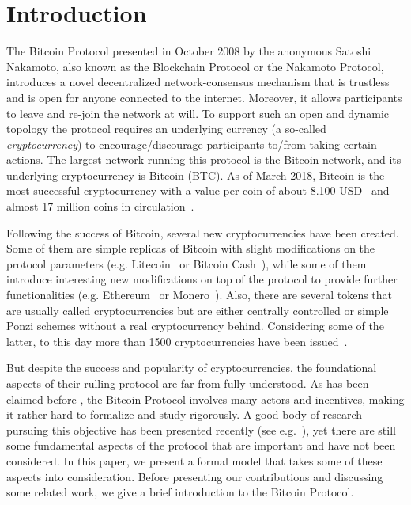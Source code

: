 
\section{Introduction}

The Bitcoin Protocol \cite{Bitcoin} presented in October 2008 by the anonymous Satoshi Nakamoto, also known as the Blockchain Protocol or the Nakamoto Protocol, introduces a novel decentralized network-consensus mechanism that is trustless and is open for anyone connected to the internet. Moreover, it allows participants to leave and re-join the network at will. To support such an open and dynamic topology the protocol requires an underlying currency (a so-called \emph{cryptocurrency}) to encourage/discourage participants to/from taking certain actions. The largest network running this protocol is the Bitcoin network, and its underlying cryptocurrency is Bitcoin (BTC). As of March 2018, Bitcoin is the most successful cryptocurrency with a value per coin of about 8.100 USD~\cite{BitcoinPrice} and almost 17 million coins in circulation~\cite{Totalcoins}.
 
Following the success of Bitcoin, several new cryptocurrencies have been created. Some of them are simple replicas of Bitcoin with slight modifications on the protocol parameters (e.g. Litecoin~\cite{Litecoin} or Bitcoin Cash~\cite{Bcash}), while some of them introduce interesting new modifications on top of the protocol to provide further functionalities (e.g. Ethereum~\cite{Ethereum} or Monero~\cite{Monero}). Also, there are several tokens that are usually called cryptocurrencies but are either centrally controlled or simple Ponzi schemes without a real cryptocurrency behind. Considering some of the latter, to this day more than 1500 cryptocurrencies have been issued~\cite{coinmarketcap}.

But despite the success and popularity of cryptocurrencies, the foundational aspects of their rulling protocol are far from fully understood. As has been claimed before \cite{mininggames:2016}, the Bitcoin Protocol involves many actors and incentives, making it rather hard to formalize and study rigorously. A good body of research pursuing this objective has been presented recently (see e.g.~\cite{mininggames:2016,optimalselfishmining2017,instabilitywithoutreward:2016}), yet there are still some fundamental aspects of the protocol that are important and have not been considered. In this paper, we present a formal model that takes some of these aspects into consideration. Before presenting our contributions and discussing some related work, we give a brief introduction to the Bitcoin Protocol.

